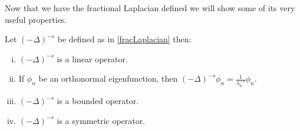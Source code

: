 Now that we have the fractional Laplacian defined we will show some of its very useful properties.
\begin{prop}\label{fracLaplacianProperties}\phantom{a}
	Let $(-\Delta)^{-s}$ be defined as in \cref{fracLaplacian} then:
	\begin{enumerate}[(i)]
		\item 	$(-\Delta)^{-s}$ is a linear operator.\label{fracGausItem1}
		\item If $\phi_n$ be an orthonormal eigenfunction, then $(-\Delta)^{-s}\phi_n = \frac{1}{\lambda_{n}^{-s}}\phi_{n}$. \label{fracGausItem2}
		\item 	$(-\Delta)^{-s}$ is a bounded operator. \label{fracGausBounded}
		\item $(-\Delta)^{-s}$ is a symmetric operator. \label{fracGausSymmetric}
	\end{enumerate}
\end{prop}
